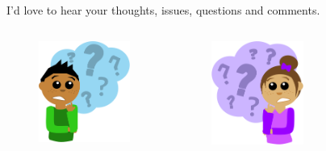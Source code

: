 \documentclass[xetex, aspectratio=169]{beamer}
\begin{document}
\begin{frame}
\centering 
\alert{I'd love to hear your thoughts, issues, questions and comments.}
\begin{columns}
	\begin{figure}
		\includegraphics[width=3cm]{img/questionguy}
	\end{figure}
		\begin{figure}
		\includegraphics[width=3cm]{img/questiongirl}
	\end{figure}
\end{columns}
\end{frame}
\end{document}
